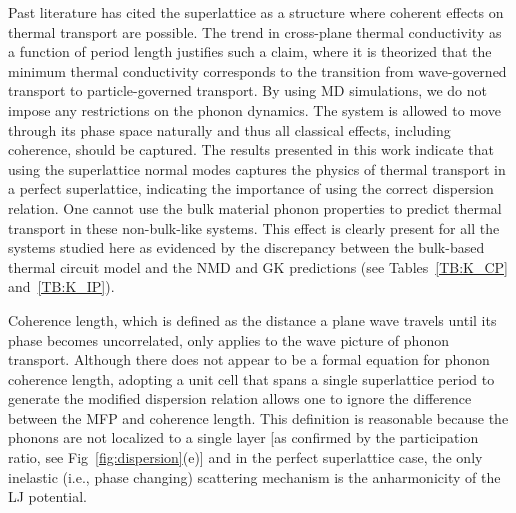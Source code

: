 \documentclass[aps,prb,preprint,preprintnumbers,amsmath,amssymb,floatfix,superscriptaddress]{revtex4}
\begin{document}

Past literature has cited the superlattice as a structure where coherent effects on thermal transport are possible. The trend in cross-plane thermal conductivity as a function of period length justifies such a claim,\cite{PhysRevB.67.195311,PhysRevB.72.174302,PhysRevB.61.3091} where it is theorized that the minimum thermal conductivity corresponds to the transition from wave-governed transport to particle-governed transport.\cite{PhysRevLett.84.927,PhysRevB.56.10754} %
By using MD simulations, we do not impose any restrictions on the phonon dynamics. The system is allowed to move through its phase space naturally and thus all classical effects, including coherence, should be captured. The results presented in this work indicate that using the superlattice normal modes captures the physics of thermal transport in a perfect superlattice, indicating the importance of using the correct dispersion relation. One cannot use the bulk material phonon properties to predict thermal transport in these non-bulk-like systems. This effect is clearly present for all the systems studied here as evidenced by the discrepancy between the bulk-based thermal circuit model and the NMD and GK predictions (see Tables~\ref{TB:K_CP} and~\ref{TB:K_IP}).

Coherence length, which is defined as the distance a plane wave travels until its phase becomes uncorrelated, only applies to the wave picture of phonon transport. Although there does not appear to be a formal equation for phonon coherence length,\cite{chen2005nanoscale} adopting a unit cell that spans a single superlattice period to generate the modified dispersion relation allows one to ignore the difference between the MFP and coherence length.\cite{PhysRevB.67.195311} This definition is reasonable because the phonons are not localized to a single layer [as confirmed by the participation ratio, see Fig~\ref{fig:dispersion}(e)] and in the perfect superlattice case, the only inelastic (i.e., phase changing) scattering mechanism is the anharmonicity of the LJ potential. 
\end{document}
